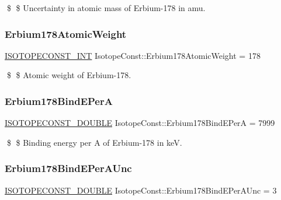 \$ \$ Uncertainty in atomic mass of Erbium-\/178 in amu. \mbox{\label{group___isotope_const-_erbium-_er178_gaba86f4792a6fc5c04784bcb57a9a0a09}} 
\subsubsection{\texorpdfstring{Erbium178\+Atomic\+Weight}{Erbium178AtomicWeight}}
{\footnotesize\ttfamily \mbox{\hyperlink{group___isotope_const-_macros_ga5f18360b3e99483a35c32d789e62621c}{I\+S\+O\+T\+O\+P\+E\+C\+O\+N\+S\+T\+\_\+\+I\+NT}} Isotope\+Const\+::\+Erbium178\+Atomic\+Weight = 178}

\$ \$ Atomic weight of Erbium-\/178. \mbox{\label{group___isotope_const-_erbium-_er178_ga376b7fec9fa7ab9266d92e4fb97b25b4}} 
\subsubsection{\texorpdfstring{Erbium178\+Bind\+E\+PerA}{Erbium178BindEPerA}}
{\footnotesize\ttfamily \mbox{\hyperlink{group___isotope_const-_macros_ga8f45a7272ce02c0b4c65c44636ed719a}{I\+S\+O\+T\+O\+P\+E\+C\+O\+N\+S\+T\+\_\+\+D\+O\+U\+B\+LE}} Isotope\+Const\+::\+Erbium178\+Bind\+E\+PerA = 7999}

\$ \$ Binding energy per A of Erbium-\/178 in keV. \mbox{\label{group___isotope_const-_erbium-_er178_ga0b365d5f8107a33cc733fcf76c1be11c}} 
\subsubsection{\texorpdfstring{Erbium178\+Bind\+E\+Per\+A\+Unc}{Erbium178BindEPerAUnc}}
{\footnotesize\ttfamily \mbox{\hyperlink{group___isotope_const-_macros_ga8f45a7272ce02c0b4c65c44636ed719a}{I\+S\+O\+T\+O\+P\+E\+C\+O\+N\+S\+T\+\_\+\+D\+O\+U\+B\+LE}} Isotope\+Const\+::\+Erbium178\+Bind\+E\+Per\+A\+Unc = 3}

